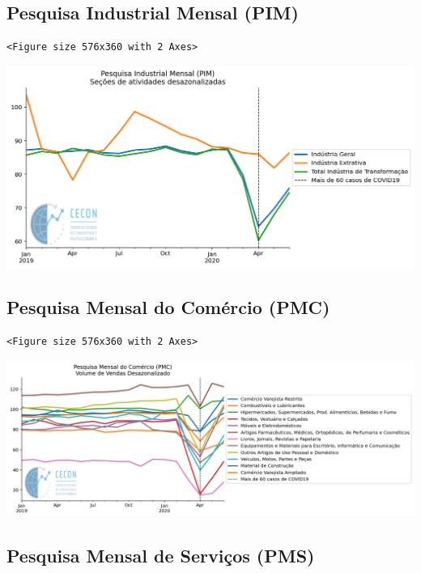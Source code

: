 \documentclass[11pt]{article}
\begin{document}
\subsection{Pesquisa Industrial Mensal (PIM)}
\label{sec:orgb89016e}

\begin{verbatim}
<Figure size 576x360 with 2 Axes>
\end{verbatim}


\begin{center}
\includegraphics[width=.9\linewidth]{obipy-resources/62e383af79e91b63c7fc98dd7fb55b3c3ececcb9/5034a4e79dd10e24d95e11c9313ca58667edc74f.png}
\end{center}


\subsection{Pesquisa Mensal do Comércio (PMC)}
\label{sec:org52bfe62}

\begin{verbatim}
<Figure size 576x360 with 2 Axes>
\end{verbatim}


\begin{center}
\includegraphics[width=.9\linewidth]{obipy-resources/62e383af79e91b63c7fc98dd7fb55b3c3ececcb9/cde2ae2a2c6518d80eceef680eb0610d47f706c1.png}
\end{center}


\subsection{Pesquisa Mensal de Serviços (PMS)}
\label{sec:org469103f}
\end{document}
